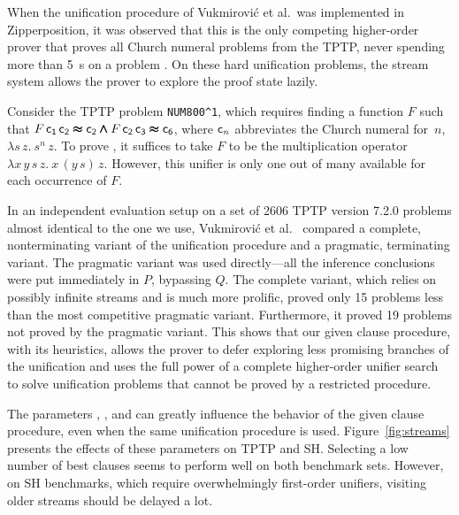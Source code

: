 \documentclass[smallcondensed,draft]{svjour3}     %
\begin{document}

When the unification procedure of Vukmirović et al.\ was implemented  in
Zipperposition, it was observed that this is the only competing
higher-order prover that proves all Church numeral problems from the TPTP,
never spending more than 5~s on a problem \cite{our-unif-paper}. On these hard
unification problems, the stream system allows the prover to explore the proof
state lazily.

Consider the TPTP problem \verb|NUM800^1|, which requires finding
a function $F$ such that $F \, \mathsf{c_1} \, \mathsf{c_2}
\pmb\approx \mathsf{c_2} \pmb\land F \, \mathsf{c_2} \, \mathsf{c_3} \pmb\approx \mathsf{c_6}$, where
$\mathsf{c}_n$ abbreviates the Church numeral for~$n$, $\lambda s\, z. \>
s^n \, z$. To prove
, it suffices to take $F$ to be the multiplication operator
$\lambda x \, y \, s \, z. \> x \, (y \, s) \, z$.
However, this unifier is only one out of many available for each occurrence of
$F$.

In an independent evaluation setup on a set of 2606 TPTP version 7.2.0
problems almost identical to the one we use, Vukmirović et al.\
\cite[Sect.~7]{our-unif-paper}
compared a complete, nonterminating variant of the unification procedure and a
pragmatic, terminating variant. The
pragmatic variant was used directly---all the inference conclusions were put
immediately in $P$, bypassing $Q$. The complete variant, which relies on
possibly infinite streams and is much more prolific, proved only 15  problems
less than the most competitive pragmatic variant. Furthermore, it proved 19
problems not proved by the pragmatic variant.
%
This shows that our given clause procedure, with its heuristics, allows the
prover to defer exploring less promising branches of the unification and uses
the full power of a complete higher-order unifier search to solve unification
problems that cannot be proved by a restricted procedure.

The parameters \ParamMode{}, \ParamRetry{}, and \ParamMaxStreams{} can greatly
influence the behavior of the given clause procedure, even when the same
unification procedure is used. Figure~\ref{fig:streams}
presents the effects of these parameters on TPTP and SH.
Selecting a low number of best clauses seems to
perform well on both benchmark sets. However, on SH benchmarks, which require
overwhelmingly first-order unifiers, visiting older streams should be delayed
a lot.
\end{document}
